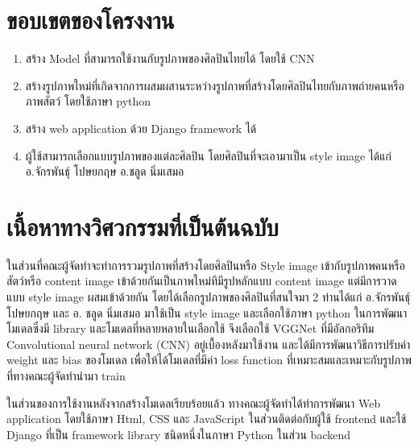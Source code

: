 \documentclass[12pt,oneside,openright,a4paper]{cpe-thai-project}
\begin{document}
\section{ขอบเขตของโครงงาน}
\begin{enumerate}
\item  สร้าง Model ที่สามารถใช้งานกับรูปภาพของศิลปินไทยได้ โดยใช้ CNN 
\item  สร้างรูปภาพใหม่ที่เกิดจากการผสมผสานระหว่างรูปภาพที่สร้างโดยศิลปินไทยกับภาพถ่ายคนหรือภาพสัตว์ โดยใช้ภาษา python
\item  สร้าง web application ด้วย Django framework ได้ 
\item ผู้ใช้สามารถเลือกแบบรูปภาพของแต่ละศิลปิน โดยศิลปินที่จะเอามาเป็น style image ได้แก่ 
\subitem อ.จักรพันธุ์ โปษยกฤษ
\subitem อ.ชลูด นิ่มเสมอ
\end{enumerate}


\section{เนื้อหาทางวิศวกรรมที่เป็นต้นฉบับ}
\par\setlength{\parindent}{5ex}ในส่วนที่คณะผู้จัดทำจะทำการรวมรูปภาพที่สร้างโดยศิลปินหรือ Style image เข้ากับรูปภาพคนหรือสัตว์หรือ content image เข้าด้วยกันเป็นภาพใหม่ทีมีรูปหลักแบบ content image แต่มีการวาดแบบ style image ผสมเข้าด้วยกัน โดยได้เลือกรูปภาพของศิลปินที่สนใจมา 2 ท่านได้แก่ อ.จักรพันธุ์ โปษยกฤษ และ อ. ชลูด นิ่มเสมอ มาใช้เป็น style image และเลือกใช้ภาษา python ในการพัฒนาโมเดลซึ่งมี library และโมเดลที่หลายหลายในเลือกใช้ จึงเลือกใช้ VGGNet ที่มีอัลกอริทึม Convolutional neural network (CNN) อยู่เบื้องหลังมาใช้งาน และได้มีการพัฒนาวิธีการปรับค่า weight และ bias ของโมเดล เพื่อให้ได้โมเดลที่มีค่า loss function ที่เหมาะสมและเหมาะกับรูปภาพที่ทางคณะผู้จัดทำนำมา train 
\par\setlength{\parindent}{5ex}ในส่วนของการใช้งานหลังจากสร้างโมเดลเรียบร้อยแล้ว ทางคณะผู้จัดทำได้ทำการพัฒนา Web application โดยใช้ภาษา Html, CSS และ JavaScript ในส่วนติดต่อกับผู้ใช้ frontend และใช้ Django  ที่เป็น framework library ชนิดหนึ่งในภาษา Python ในส่วน backend
\end{document}
